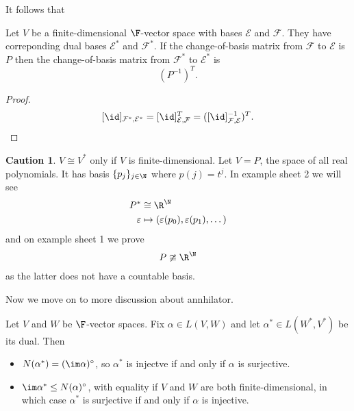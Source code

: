 \documentclass[a4paper]{article}
\newcommand*{\ann}{\circ}
\newcommand*{\basis}{\mathcal}
\theoremstyle{definition}
\newtheorem*{caution}{Caution}
\begin{document}
It follows that
\begin{lemma}
  Let \(V\) be a finite-dimensional \(\F\)-vector space with bases \(\basis E\) and \(\basis F\). They have correponding dual bases \(\basis E^*\) and \(\basis F^*\). If the change-of-basis matrix from \(\basis F\) to \(\basis E\) is \(P\) then the change-of-basis matrix from \(\basis F^*\) to \(\basis E^*\) is
  \[
    (P^{-1})^T.
  \]
\end{lemma}

\begin{proof}
  \[
    [\id]_{\basis F^*,\basis E^*} = [\id]_{\basis E, \basis F}^T = ([\id]_{\basis F, \basis E}^{-1})^T.
  \]
\end{proof}

\begin{caution}
  \(V \cong V^*\) only if \(V\) is finite-dimensional. Let \(V = P\), the space of all real polynomials. It has basis \(\{p_j\}_{j\in \N}\) where \(p(j) = t^j\). In example sheet 2 we will see
\begin{align*}
  P^* &\cong \R^\N \\
  \varepsilon &\mapsto (\varepsilon(p_0), \varepsilon(p_1), \dots)
\end{align*}
and on example sheet 1 we prove
\[
  P \ncong \R^\N
\]
as the latter does not have a countable basis.
\end{caution}

Now we move on to more discussion about annhilator.

\begin{lemma}
  Let \(V\) and \(W\) be \(\F\)-vector spaces. Fix \(\alpha \in L(V,W)\) and let \(\alpha^* \in L(W^*, V^*)\) be its dual. Then
  \begin{itemize}
  \item \(N(\alpha^*) = (\im \alpha)^\ann\), so \(\alpha^*\) is injectve if and only if \(\alpha\) is surjective.
  \item \(\im \alpha^* \leq N(\alpha)^\ann\), with equality if \(V\) and \(W\) are both finite-dimensional, in which case \(\alpha^*\) is surjective if and only if \(\alpha\) is injective.
  \end{itemize}
\end{lemma}
\end{document}
